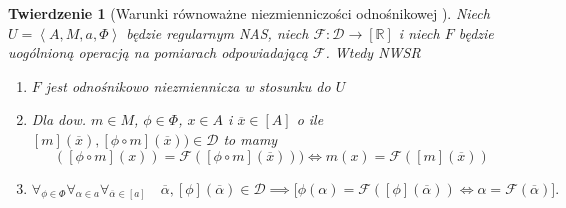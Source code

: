 \documentclass[12pt,a4paper]{report}
\newtheorem{tw}[definition]{Twierdzenie}
\newcommand{\domkniecie}[1]{\left[ {#1} \right] }
\newcommand{\tuple}[1]{\left\langle {#1} \right\rangle}
\begin{document}
\begin{tw}[Warunki równoważne niezmienniczości odnośnikowej {\citep[Tw. 1]{adams1965theory}}]
Niech $U=\tuple{A,M,a,\Phi}$ będzie regularnym NAS, niech $\mathcal{F}:\mathcal{D}\to \domkniecie{\mathbb{R}}$ i niech $F$ będzie uogólnioną operacją na pomiarach odpowiadającą $\mathcal{F}$. Wtedy
NWSR
\begin{enumerate}
\item
$F$ jest odnośnikowo niezmiennicza w stosunku do $U$
\item
Dla dow. $m \in M$, $\phi \in \Phi$, $ x \in A$ i $\overline{x} \in \domkniecie{A}$ o ile $\domkniecie{m}(\overline{x}), \domkniecie{\phi\circ m}(\overline{x})) \in \mathcal{D}$ to mamy
$$
(\domkniecie{\phi\circ m}(x))=\mathcal{F}( \domkniecie{\phi \circ m}(\overline{x}))) \iff m(x)=\mathcal{F}(\domkniecie{m}(\overline{x}))
$$
\item
$$
\forall_{\phi \in \Phi}\forall_{\alpha \in a}\forall_{\overline{\alpha} \in \domkniecie{a}} \quad \overline{\alpha}, \domkniecie{\phi}(\overline{\alpha}) \in \mathcal{D} \implies \big[\phi(\alpha)=\mathcal{F}(\domkniecie{\phi}(\overline{\alpha})) \iff \alpha=\mathcal{F}(\overline{\alpha})\big].
$$
\end{enumerate}

\end{tw}
\end{document}
